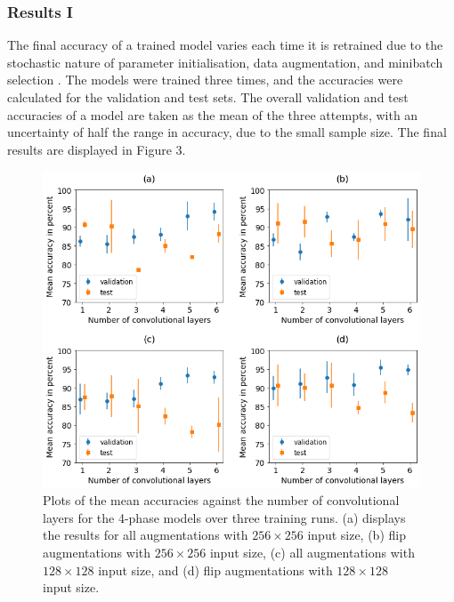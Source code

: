 \documentclass[12pt]{article}
\begin{document}
\subsubsection{Results I}
The final accuracy of a trained model varies each time it is retrained due to the stochastic nature of parameter initialisation, data augmentation, and minibatch selection \cite{Goodfellow16}. The models were trained three times, and the accuracies were calculated for the validation and test sets. The overall validation and test accuracies of a model are taken as the mean of the three attempts, with an uncertainty of half the range in accuracy, due to the small sample size. The final results are displayed in Figure 3.
\begin{figure}[!htb]
	\centering
    \includegraphics[width=6.6in]{images/4-phase_graphs.png}
    \caption{Plots of the mean accuracies against the number of convolutional layers for the 4-phase models over three training runs. (a) displays the results for all augmentations with $256 \times 256$ input size, (b) flip augmentations with $256 \times 256$ input size, (c) all augmentations with $128 \times 128$ input size, and (d) flip augmentations with $128 \times 128$ input size.}
\end{figure} 
\end{document}

